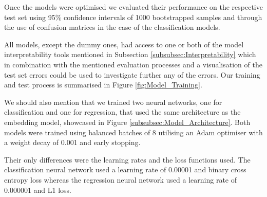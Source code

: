Once the models were optimised we evaluated their performance on the respective test set using 95\% confidence intervals of 1000 bootstrapped samples and through the use of confusion matrices in the case of the classification models. 

All models, except the dummy ones, had access to one or both of the model interpretability tools mentioned in Subsection \ref{subsubsec:Interpretability} which in combination with the mentioned evaluation processes and a visualisation of the test set errors could be used to investigate further any of the errors. Our training and test process is summarised in Figure \ref{fig:Model_Training}.

We should also mention that we trained two neural networks, one for classification and one for regression, that used the same architecture as the embedding model, showcased in Figure \ref{subsubsec:Model_Architecture}. Both models were trained using balanced batches of 8 utilising an Adam optimiser with a weight decay of 0.001 and early stopping. 

Their only differences were the learning rates and the loss functions used. The classification neural network used a learning rate of 0.00001 and binary cross entropy loss whereas the regression neural network used a learning rate of 0.000001 and L1 loss.

